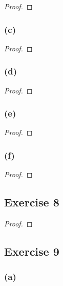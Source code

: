 \documentclass[14pt]{extarticle}
\begin{document}
\begin{proof}

\end{proof}

\subsubsection{(c)}

\begin{proof}

\end{proof}

\subsubsection{(d)}

\begin{proof}

\end{proof}

\subsubsection{(e)}

\begin{proof}

\end{proof}

\subsubsection{(f)}

\begin{proof}

\end{proof}

\subsection{Exercise 8}

\begin{proof}

\end{proof}

\subsection{Exercise 9}

\subsubsection{(a)}
\end{document}
